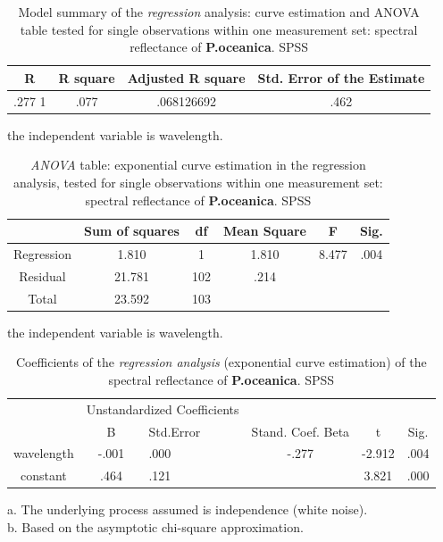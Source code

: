 \documentclass[10pt, a4paper]{article}
\begin{document}
\begin{appendices}
\begin{table}[htbp]
\caption{Model summary of the \textit{regression} analysis: curve estimation and ANOVA table tested for single observations within one measurement set: spectral reflectance of \textbf{P.oceanica}. SPSS}
\label{tab:5}
\begin{center}
\begin{tabular}{|c|c|c|c|}
\hline\hline
\textbf{R} & \textbf{R square} & \textbf{Adjusted R square} & \textbf{Std. Error of the Estimate} \\ \hline\hline
.277 1 & .077 & .068126692 & .462 \\ \hline
\end{tabular}
\end{center}
the independent variable is wavelength. 
\label{fig:5}
\end{table}

\begin{table}[htbp]
\caption{\textit{ANOVA} table: exponential curve estimation in the regression analysis, tested for single observations within one measurement set: spectral reflectance of \textbf{P.oceanica}. SPSS}
\label{tab:6}
\begin{center}
\begin{tabular}{|c|c|c|c| c|c|}
\hline\hline
& \textbf{Sum of squares} & \textbf{df} & \textbf{Mean Square} & F & Sig.\\ \hline\hline
Regression & 1.810 & 1 & 1.810 & 8.477 & .004\\ \hline
Residual & 21.781 & 102 & .214 & & \\ \hline
Total & 23.592 & 103 & & & \\ \hline
\end{tabular}
\end{center}
the independent variable is wavelength. 
\label{fig:5}
\end{table}

\begin{table}[htbp]
\caption{Coefficients of the \textit{regression analysis} (exponential curve estimation) of the spectral reflectance of \textbf{P.oceanica}. SPSS}
\label{tab:7}
\begin{center}
\begin{tabular}{| c | c | p{2cm}| c | c | c |}
\hline\hline
& \multicolumn{2}{|c|}{Unstandardized Coefficients}\\
\cline{2-3}
& B & Std.Error & Stand. Coef. Beta & t & Sig.\\ \hline\hline
wavelength & -.001 & .000 & -.277 & -2.912 & .004 \\ \hline
constant & .464 & .121 & & 3.821 & .000 \\ \hline
\end{tabular}
\end{center}
a. The underlying process assumed is independence (white noise).\\
b. Based on the asymptotic chi-square approximation.
\label{fig:5}
\end{table}
\pagebreak


\end{appendices}
\end{document}
